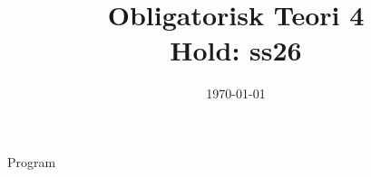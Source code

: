 \documentclass[11pt,aspectratio=169]{beamer}
\title{Obligatorisk Teori 4 \\
Hold: ss26}
\date{\today}
\begin{document}
\begin{frame}
  \titlepage
\end{frame}

\begin{frame}{Program}
  \tableofcontents
\end{frame}























%

%

%
\end{document}

